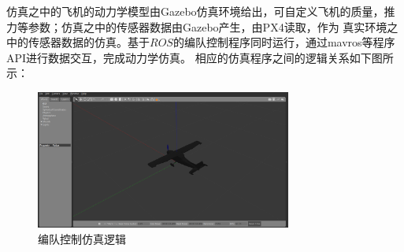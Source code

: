 仿真之中的飞机的动力学模型由Gazebo仿真环境给出，可自定义飞机的质量，推力等参数；仿真之中的传感器数据由Gazebo产生，由PX4读取，作为
真实环境之中的传感器数据的仿真。基于$ROS$的编队控制程序同时运行，通过mavros等程序API进行数据交互，完成动力学仿真。
相应的仿真程序之间的逻辑关系如下图所示：
\begin{figure}[H]
    \centering
    \includegraphics[width=0.75\textwidth]{figures/c4/Gazebo.png}
    \caption{编队控制仿真逻辑}\label{fig:c4-simulation-struct}
\end{figure}
